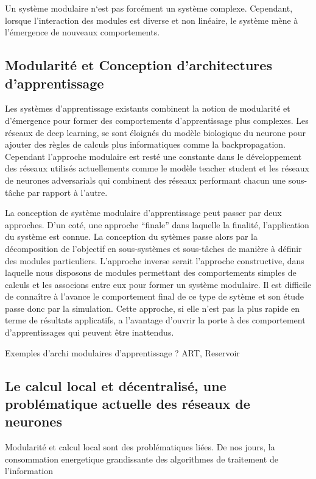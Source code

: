 Un système modulaire n‘est pas forcément un système complexe.
Cependant, lorsque l'interaction des modules est diverse et non linéaire, le système mène à l'émergence de nouveaux comportements.

\subsection*{Modularité et Conception d'architectures d'apprentissage}

Les systèmes d'apprentissage existants combinent la notion de modularité et d'émergence pour former des comportements d'apprentissage plus complexes.
Les réseaux de deep learning, se sont éloignés du modèle biologique du neurone pour ajouter des règles de calculs plus informatiques comme la backpropagation. Cependant l'approche modulaire est resté une constante dans le développement des réseaux utilisés actuellements comme le modèle teacher student et les réseaux de neurones adversarials qui combinent des réseaux performant chacun une sous-tâche par rapport à l'autre.

La conception de système modulaire d'apprentissage peut passer par deux approches. D'un coté, une approche “finale” dans laquelle la finalité, l'application du système est connue. La conception du sytèmes passe alors par la décomposition de l'objectif en sous-systèmes et sous-tâches de manière à définir des modules particuliers.
L'approche inverse serait l'approche constructive, dans laquelle nous disposons de modules permettant des comportements simples de calculs et les associons entre eux pour former un système modulaire. Il est difficile de connaître à l'avance le comportement final de ce type de sytème et son étude passe donc par la simulation.
Cette approche, si elle n'est pas la plus rapide en terme de résultats applicatifs, a l'avantage d'ouvrir la porte à des comportement d'apprentissages qui peuvent être inattendus. 

Exemples d'archi modulaires d'apprentissage ? ART, Reservoir

\subsection*{Le calcul local et décentralisé, une problématique actuelle des réseaux de neurones}

Modularité et calcul local sont des problématiques liées. De nos jours, la consommation energetique grandissante des  algorithmes de traitement de l'information  

